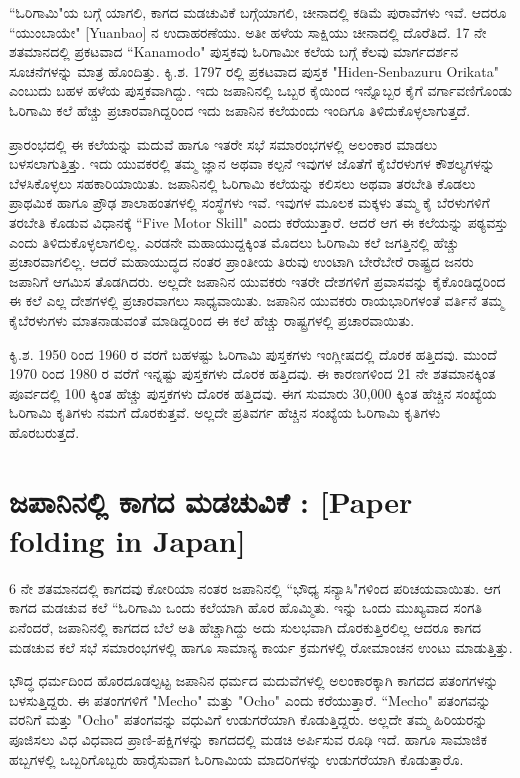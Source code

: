 ``ಓರಿಗಾಮಿ"ಯ ಬಗ್ಗೆ ಯಾಗಲಿ, ಕಾಗದ ಮಡಚುವಿಕೆ ಬಗ್ಗೆಯಾಗಲಿ, ಚೀನಾದಲ್ಲಿ ಕಡಿಮೆ ಪುರಾವೆಗಳು ಇವೆ. ಆದರೂ ``ಯುಂಬಾಯೇ" [Yuanbao] ನ ಉದಾಹರಣೆಯು. ಅತೀ ಹಳೆಯ ಸಾಕ್ಷಿಯು ಚೀನಾದಲ್ಲಿ ದೊರೆತಿದೆ. 17 ನೇ ಶತಮಾನದಲ್ಲಿ ಪ್ರಕಟವಾದ ``Kanamodo" ಪುಸ್ತಕವು ಓರಿಗಾಮೀ ಕಲೆಯ ಬಗ್ಗೆ ಕೆಲವು ಮಾರ್ಗದರ್ಶನ ಸೂಚನೆಗಳನ್ನು ಮಾತ್ರ ಹೊಂದಿತ್ತು. ಕಿೃ.ಶ. 1797 ರಲ್ಲಿ ಪ್ರಕಟವಾದ ಪುಸ್ತಕ  "Hiden-Senbazuru Orikata" ಎಂಬುದು ಬಹಳ ಹಳೆಯ ಪುಸ್ತಕವಾಗಿದ್ದು. ಇದು ಜಪಾನಿನಲ್ಲಿ ಒಬ್ಬರ  ಕೈಯಿಂದ ಇನ್ನೊಬ್ಬರ ಕೈಗೆ ವರ್ಗಾವಣಿಗೊಂಡು ಓರಿಗಾಮಿ ಕಲೆ ಹೆಚ್ಚು ಪ್ರಚಾರವಾಗಿದ್ದರಿಂದ ಇದು ಜಪಾನಿನ ಕಲೆಯಂದು ಇಂದಿಗೂ ತಿಳಿದುಕೊಳ್ಳಲಾಗುತ್ತದೆ. 

ಪ್ರಾರಂಭದಲ್ಲಿ ಈ ಕಲೆಯನ್ನು ಮದುವೆ ಹಾಗೂ ಇತರೇ ಸಭೆ ಸಮಾರಂಭಗಳಲ್ಲಿ ಅಲಂಕಾರ ಮಾಡಲು ಬಳಸಲಾಗುತ್ತಿತ್ತು. ಇದು ಯುವಕರಲ್ಲಿ ತಮ್ಮ ಜ್ಞಾನ ಅಥವಾ ಕಲ್ಪನೆ ಇವುಗಳ ಜೊತೆಗೆ ಕೈಬೆರಳುಗಳ ಕೌಶಲ್ಯಗಳನ್ನು ಬೆಳಸಿಕೊಳ್ಳಲು ಸಹಕಾರಿಯಾಯಿತು. ಜಪಾನಿನಲ್ಲಿ ಓರಿಗಾಮಿ ಕಲೆಯನ್ನು ಕಲಿಸಲು ಅಥವಾ ತರಬೇತಿ ಕೊಡಲು ಪ್ರಾಥಮಿಕ ಹಾಗೂ ಪ್ರೌಢ ಶಾಲಾಹಂತಗಳಲ್ಲಿ ಸಂಸ್ಥೆಗಳು ಇವೆ. ಇವುಗಳ ಮೂಲಕ ಮಕ್ಕಳು ತಮ್ಮ ಕೈ ಬೆರಳುಗಳಿಗೆ ತರಬೇತಿ ಕೊಡುವ ವಿಧಾನಕ್ಕೆ ``Five Motor Skill" ಎಂದು ಕರೆಯುತ್ತಾರೆ. ಆದರೆ ಆಗ ಈ ಕಲೆಯನ್ನು ಪಠ್ಯವಸ್ತು ಎಂದು ತಿಳಿದುಕೊಳ್ಳಲಾಗಲಿಲ್ಲ. ಎರಡನೇ ಮಹಾಯುದ್ದಕ್ಕಿಂತ ಮೊದಲು ಓರಿಗಾಮಿ ಕಲೆ ಜಗತ್ತಿನಲ್ಲಿ ಹೆಚ್ಚು ಪ್ರಚಾರವಾಗಲಿಲ್ಲ. ಆದರೆ ಮಹಾಯುದ್ಧದ ನಂತರ ಪ್ರಾಂತೀಯ ತಿರುವು ಉಂಟಾಗಿ ಬೇರೆಬೇರೆ ರಾಷ್ಟ್ರದ ಜನರು ಜಪಾನಿಗೆ ಆಗಮಿಸ ತೊಡಗಿದರು. ಅಲ್ಲದೇ  ಜಪಾನಿನ ಯುವಕರು ಇತರೇ ದೇಶಗಳಿಗೆ ಪ್ರವಾಸವನ್ನು ಕೈಕೊಂಡಿದ್ದರಿಂದ ಈ ಕಲೆ ಎಲ್ಲ ದೇಶಗಳಲ್ಲಿ ಪ್ರಚಾರವಾಗಲು ಸಾಧ್ಯವಾಯಿತು. ಜಪಾನಿನ ಯುವಕರು ರಾಯಭಾರಿಗಳಂತೆ ವರ್ತಿನೆ ತಮ್ಮ ಕೈಬೆರಳುಗಳು ಮಾತನಾಡುವಂತೆ ಮಾಡಿದ್ದರಿಂದ ಈ ಕಲೆ ಹೆಚ್ಚು ರಾಷ್ಟ್ರಗಳಲ್ಲಿ ಪ್ರಚಾರವಾಯಿತು. 

ಕಿೃ.ಶ. 1950 ರಿಂದ 1960 ರ ವರಗೆ ಬಹಳಷ್ಟು ಓರಿಗಾಮಿ ಪುಸ್ತಕಗಳು ಇಂಗ್ಲೀಷದಲ್ಲಿ ದೊರಕ ಹತ್ತಿದವು. ಮುಂದೆ 1970 ರಿಂದ 1980 ರ ವರೆಗೆ ಇನ್ನಷ್ಟು ಪುಸ್ತಕಗಳು ದೊರಕ ಹತ್ತಿದವು. ಈ ಕಾರಣಗಳಿಂದ 21 ನೇ ಶತಮಾನಕ್ಕಿಂತ ಪೂರ್ವದಲ್ಲಿ 100 ಕ್ಕಿಂತ ಹೆಚ್ಚು ಪುಸ್ತಕಗಳು ದೊರಕ ಹತ್ತಿದವು. ಈಗ ಸುಮಾರು 30,000 ಕ್ಕಿಂತ ಹೆಚ್ಚಿನ ಸಂಖ್ಯೆಯ ಓರಿಗಾಮಿ ಕೃತಿಗಳು ನಮಗೆ ದೊರಕುತ್ತವೆ. ಅಲ್ಲದೇ ಪ್ರತಿವರ್ಗ ಹೆಚ್ಚಿನ ಸಂಖ್ಯೆಯ ಓರಿಗಾಮಿ ಕೃತಿಗಳು ಹೊರಬರುತ್ತದೆ. 

\section*{ಜಪಾನಿನಲ್ಲಿ ಕಾಗದ ಮಡಚುವಿಕೆ : [Paper folding in Japan]} 
6 ನೇ ಶತಮಾನದಲ್ಲಿ ಕಾಗದವು ಕೋರಿಯಾ ನಂತರ ಜಪಾನಿನಲ್ಲಿ ``ಭೌಧ್ಯ ಸನ್ಯಾಸಿ"ಗಳಿಂದ ಪರಿಚಯವಾಯಿತು. ಆಗ ಕಾಗದ ಮಡಚುವ ಕಲೆ ``ಓರಿಗಾಮಿ ಒಂದು ಕಲೆಯಾಗಿ ಹೊರ ಹೊಮ್ಮಿತು. ಇನ್ನು ಒಂದು ಮುಖ್ಯವಾದ ಸಂಗತಿ ಏನೆಂದರೆ, ಜಪಾನಿನಲ್ಲಿ ಕಾಗದದ ಬೆಲೆ ಅತಿ ಹೆಚ್ಚಾಗಿದ್ದು ಅದು ಸುಲಭವಾಗಿ ದೊರಕುತ್ತಿರಲಿಲ್ಲ ಆದರೂ ಕಾಗದ ಮಡಚುವ ಕಲೆ ಸಭೆ ಸಮಾರಂಭಗಳಲ್ಲಿ ಹಾಗೂ ಸಾಮಾನ್ಯ ಕಾರ್ಯ ಕ್ರಮಗಳಲ್ಲಿ ರೋಮಾಂಚನ ಉಂಟು ಮಾಡುತ್ತಿತ್ತು. 

ಭೌದ್ಧ ಧರ್ಮದಿಂದ ಹೊರದೂಡಲ್ಪಟ್ಟ ಜಪಾನಿನ ಧರ್ಮದ ಮದುವೆಗಳಲ್ಲಿ ಅಲಂಕಾರಕ್ಕಾಗಿ ಕಾಗದದ ಪತಂಗಗಳನ್ನು ಬಳಸುತ್ತಿದ್ದರು. ಈ ಪತಂಗಗಳಿಗೆ  "Mecho" ಮತ್ತು  "Ocho" ಎಂದು ಕರೆಯುತ್ತಾರೆ. ``Mecho" ಪತಂಗವನ್ನು ವರನಿಗೆ ಮತ್ತು "Ocho" ಪತಂಗವನ್ನು ವಧುವಿಗೆ ಉಡುಗರೆಯಾಗಿ ಕೊಡುತ್ತಿದ್ದರು. ಅಲ್ಲದೇ ತಮ್ಮ ಹಿರಿಯರನ್ನು ಪೂಜಿಸಲು ವಿಧ ವಿಧವಾದ ಪ್ರಾಣಿ-ಪಕ್ಷಿಗಳನ್ನು ಕಾಗದದಲ್ಲಿ ಮಡಚಿ ಅರ್ಪಿಸುವ ರೂಢಿ ಇದೆ. ಹಾಗೂ ಸಾಮಾಜಿಕ ಹಬ್ಬಗಳಲ್ಲಿ ಒಬ್ಬರಿಗೊಬ್ಬರು ಹಾರೈಸುವಾಗ ಓರಿಗಾಮಿಯ ಮಾದರಿಗಳನ್ನು ಉಡುಗರೆಯಾಗಿ ಕೊಡುತ್ತಾರೊ. 

